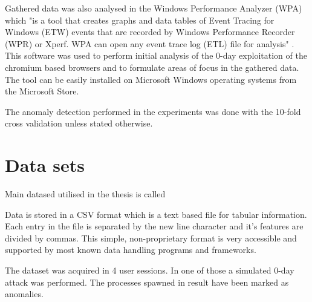 \documentclass[a4paper,twoside,12pt]{book}
\begin{document}
Gathered data was also analysed in the Windows Performance Analyzer (WPA) which "is a tool that 
creates graphs and data tables of Event Tracing for Windows (ETW) events that are recorded 
by Windows Performance Recorder (WPR) or Xperf. WPA can open any event trace log (ETL) file 
for analysis" \cite{bib:wpa}. This software was used to perform initial analysis of the 0-day 
exploitation of the chromium based browsers and to formulate areas of focus in the gathered data. 
The tool can be easily installed on Microsoft Windows operating systems from the Microsoft Store.

The anomaly detection performed in the experiments was done with the 10-fold cross validation 
unless stated otherwise.

\section{Data sets}

Main datased utilised in the thesis is called 

Data is stored in a CSV format which is a text based file for tabular information.  
Each entry in the file is separated by the new line character and it's features are divided 
by commas. This simple, non-proprietary format is very accessible and supported by most 
known data handling programs and frameworks. 

The dataset was acquired in 4 user sessions. In one of those a simulated 0-day attack was 
performed. The processes spawned in result have been marked as anomalies. 
\end{document}
